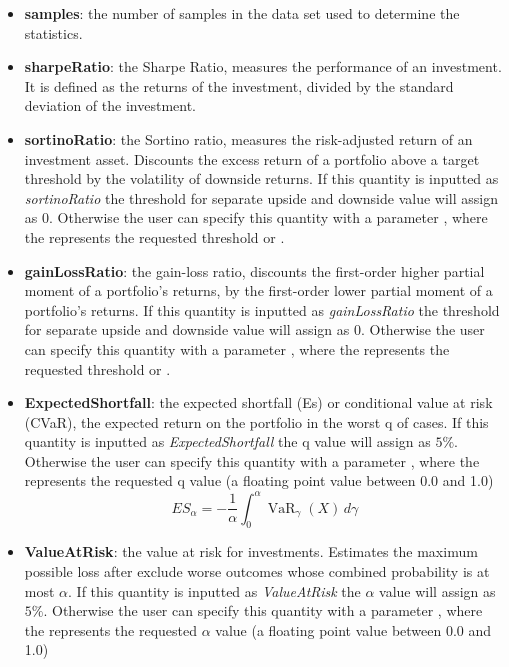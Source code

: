 \begin{itemize}
\begin{itemize}
    \item \textbf{samples}: the number of samples in the data set used to determine the statistics.
    \item \textbf{sharpeRatio}: the Sharpe Ratio, measures the performance of an investment. It is defined as the returns of the investment, divided by the standard deviation of the investment. 
    \item \textbf{sortinoRatio}: the Sortino ratio, measures the risk-adjusted return of an investment asset. Discounts the excess return of a portfolio above a target threshold by the volatility of downside returns. If this quantity is inputted as \textit{sortinoRatio} the threshold for separate upside and downside value will assign as $0$. Otherwise the user can specify this quantity with a parameter , where the  represents the requested threshold  or .

    \item \textbf{gainLossRatio}: the gain-loss ratio, discounts the first-order higher partial moment of a portfolio's returns, by the first-order lower partial moment of a portfolio's returns. If this quantity is inputted as \textit{gainLossRatio} the threshold for separate upside and downside value will assign as $0$. Otherwise the user can specify this quantity with a parameter , where the  represents the requested threshold  or .


    \item \textbf{ExpectedShortfall}: the expected shortfall (Es) or conditional value at risk (CVaR), the expected return on the portfolio in the worst q of cases. If this quantity is inputted as \textit{ExpectedShortfall} the q value will assign as $5\%$. Otherwise the user can specify this quantity with a parameter , where the  represents the requested q value (a floating point value between 0.0 and 1.0)
    \begin{equation}
      ES_\alpha = -\frac{1}{\alpha} \int_0^\alpha \operatorname{VaR}_\gamma(X) \, d\gamma
    \end{equation}
    \item \textbf{ValueAtRisk}: the value at risk for investments. Estimates the maximum possible loss after exclude worse outcomes whose combined probability is at most $\alpha$. If this quantity is inputted as \textit{ValueAtRisk} the $\alpha$ value will assign as $5\%$. Otherwise the user can specify this quantity with a parameter , where the  represents the requested $\alpha$ value (a floating point value between 0.0 and 1.0)


\end{itemize}
\end{itemize}
